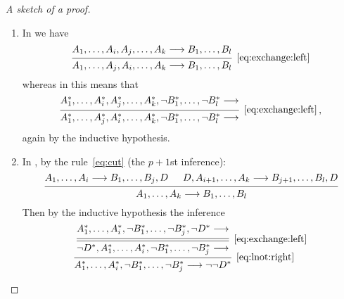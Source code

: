 \documentclass[11pt,a4paper]{article}
\begin{document}
\begin{proof}[A sketch of a proof]
\begin{enumerate}
\begin{enumerate}
                \item
                    In \LK{} we have
                    \begin{equation*}
                        \begin{prooftree}
                            \hypo{A_1,\ldots, A_i,A_j,\ldots,A_k\seq B_1,\ldots,B_l}
                            \infer1[\eqref{eq:exchange:left}]{A_1,\ldots, A_j,A_i,\ldots,A_k\seq B_1,\ldots,B_l}
                        \end{prooftree}
                    \end{equation*}
                    whereas in \LJ{} this means that
                    \begin{equation*}
                        \begin{prooftree}
                            \hypo{A_1^\ast,\ldots, A_i^\ast,A_j^\ast,\ldots,A_k^\ast, \lnot B_1^\ast,\ldots,\lnot B_l^\ast\seq}
                            \infer1[\eqref{eq:exchange:left}]{A_1^\ast,\ldots, A_j^\ast,A_i^\ast,\ldots,A_k^\ast, \lnot B_1^\ast,\ldots,\lnot B_l^\ast\seq},
                        \end{prooftree}\,,
                    \end{equation*}
                    again by the inductive hypothesis.
                \item
                    In \LK{}, by the rule~\eqref{eq:cut} (the \(p+1\)st inference):
                    \begin{equation*}
                        \begin{prooftree}
                            \hypo{A_1,\ldots,A_i\seq B_1,\ldots,B_j, D}
                            \hypo{D, A_{i+1},\ldots,A_k\seq B_{j+1},\ldots,B_l, D}
                            \infer2{A_1,\ldots,A_k\seq B_1,\ldots,B_l}
                        \end{prooftree}
                    \end{equation*}
                    Then by the inductive hypothesis the inference
                    \scriptsize
                    \begin{equation*}
                        \begin{prooftree}
                            \hypo{A_1^\ast,\ldots,A_i^\ast, \lnot B_1^\ast,\ldots,\lnot B_j^\ast,\lnot D^\ast\seq}
                            \infer[double]1[\eqref{eq:exchange:left}]{\lnot D^\ast, A_1^\ast,\ldots,A_i^\ast, \lnot B_1^\ast,\ldots,\lnot B_j^\ast\seq}
                            \infer1[\eqref{eq:lnot:right}]{A_1^\ast,\ldots,A_i^\ast, \lnot B_1^\ast,\ldots,\lnot B_j^\ast\seq\lnot\lnot D^\ast}

\end{prooftree}
\end{equation*}
\end{enumerate}
\end{enumerate}
\end{proof}
\end{document}
